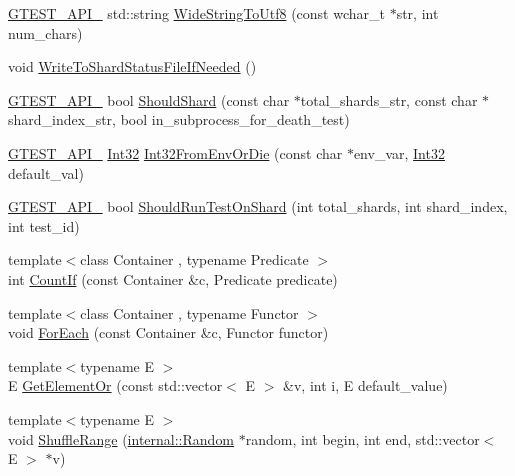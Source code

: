 \begin{DoxyCompactItemize}
\item 
\hyperlink{gtest-port_8h_aa73be6f0ba4a7456180a94904ce17790}{G\-T\-E\-S\-T\-\_\-\-A\-P\-I\-\_\-} std\-::string \hyperlink{namespacetesting_1_1internal_a05b8c86ff38243f34d8f839a0eadefb1}{Wide\-String\-To\-Utf8} (const wchar\-\_\-t $\ast$str, int num\-\_\-chars)
\item 
void \hyperlink{namespacetesting_1_1internal_a19b35b39782d41e6ef76e1910a3a502e}{Write\-To\-Shard\-Status\-File\-If\-Needed} ()
\item 
\hyperlink{gtest-port_8h_aa73be6f0ba4a7456180a94904ce17790}{G\-T\-E\-S\-T\-\_\-\-A\-P\-I\-\_\-} bool \hyperlink{namespacetesting_1_1internal_a0fe41657b1d1ab7ec4e37ec07403ee6c}{Should\-Shard} (const char $\ast$total\-\_\-shards\-\_\-str, const char $\ast$shard\-\_\-index\-\_\-str, bool in\-\_\-subprocess\-\_\-for\-\_\-death\-\_\-test)
\item 
\hyperlink{gtest-port_8h_aa73be6f0ba4a7456180a94904ce17790}{G\-T\-E\-S\-T\-\_\-\-A\-P\-I\-\_\-} \hyperlink{namespacetesting_1_1internal_af89e21e4043b5cf0c120af487b24fa06}{Int32} \hyperlink{namespacetesting_1_1internal_aaa576613655c2f380278c255c3ec5fef}{Int32\-From\-Env\-Or\-Die} (const char $\ast$env\-\_\-var, \hyperlink{namespacetesting_1_1internal_af89e21e4043b5cf0c120af487b24fa06}{Int32} default\-\_\-val)
\item 
\hyperlink{gtest-port_8h_aa73be6f0ba4a7456180a94904ce17790}{G\-T\-E\-S\-T\-\_\-\-A\-P\-I\-\_\-} bool \hyperlink{namespacetesting_1_1internal_a437bd89f5bc532778d7467600e210395}{Should\-Run\-Test\-On\-Shard} (int total\-\_\-shards, int shard\-\_\-index, int test\-\_\-id)
\item 
{\footnotesize template$<$class Container , typename Predicate $>$ }\\int \hyperlink{namespacetesting_1_1internal_a1e77a774d910346eff11a86d8df783a5}{Count\-If} (const Container \&c, Predicate predicate)
\item 
{\footnotesize template$<$class Container , typename Functor $>$ }\\void \hyperlink{namespacetesting_1_1internal_a52f5504ed65d116201ccb8f99a44fd7e}{For\-Each} (const Container \&c, Functor functor)
\item 
{\footnotesize template$<$typename E $>$ }\\E \hyperlink{namespacetesting_1_1internal_a71fdd20a0686bea3dc0cdcd95e0bca1c}{Get\-Element\-Or} (const std\-::vector$<$ E $>$ \&v, int i, E default\-\_\-value)
\item 
{\footnotesize template$<$typename E $>$ }\\void \hyperlink{namespacetesting_1_1internal_a0e1d3dc36138a591769412d4c7779861}{Shuffle\-Range} (\hyperlink{classtesting_1_1internal_1_1_random}{internal\-::\-Random} $\ast$random, int begin, int end, std\-::vector$<$ E $>$ $\ast$v)

\end{DoxyCompactItemize}
